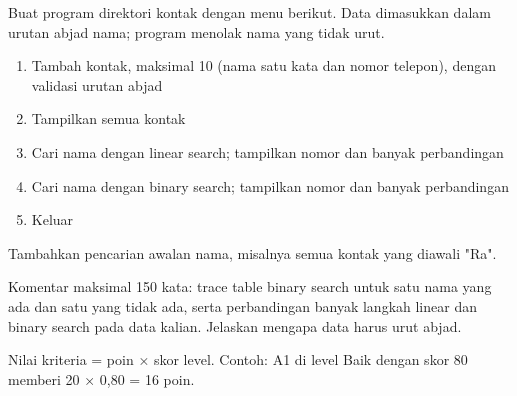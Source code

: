 \documentclass[a4paper]{article}
\begin{document}
Buat program direktori kontak dengan menu berikut. Data dimasukkan dalam urutan abjad nama; program menolak nama yang tidak urut.
\begin{enumerate}
\item Tambah kontak, maksimal 10 (nama satu kata dan nomor telepon), dengan validasi urutan abjad
\item Tampilkan semua kontak
\item Cari nama dengan linear search; tampilkan nomor dan banyak perbandingan
\item Cari nama dengan binary search; tampilkan nomor dan banyak perbandingan
\item Keluar
\end{enumerate}
\begin{Contoh}
Tambahkan pencarian awalan nama, misalnya semua kontak yang diawali "Ra".
\end{Contoh}
Komentar maksimal 150 kata: trace table binary search untuk satu nama yang ada dan satu yang tidak ada, serta perbandingan banyak langkah linear dan binary search pada data kalian. Jelaskan mengapa data harus urut abjad.

\par\vspace{4pt}\par\vspace{6pt}
Nilai kriteria = poin × skor level. Contoh: A1 di level Baik dengan skor 80 memberi 20 × 0,80 = 16 poin.
\end{document}
